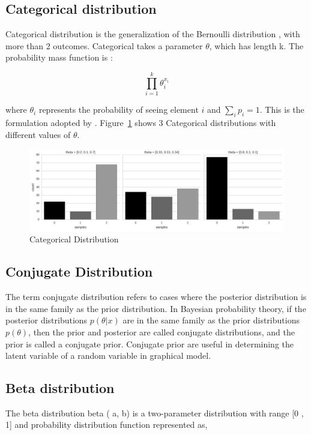 \subsection*{Categorical distribution}
Categorical distribution is the generalization of the Bernoulli distribution , with more than 2 outcomes.  Categorical takes a parameter $\theta$, which has length k. The probability mass function is :

$$
\prod_{i=1}^k \theta_i^{x_i}
$$

where $\theta_i$ represents the probability of seeing element $i$ and $\sum_{i}p_i = 1$. This is the formulation adopted by \cite{bishop2007pattern}.  Figure~\ref{fig:Categorical_sample} shows 3 Categorical distributions with different values of $\theta$.

\begin{figure}[htp]
\centering
\includegraphics[width=\textwidth]{images/Categorical.png}
\caption{Categorical Distribution}
\label{fig:Categorical_sample}
\end{figure}


\subsection*{Conjugate Distribution}
The term conjugate distribution \cite{BS:BS3830070108} refers to cases where the posterior distribution is in the same family as the prior distribution. In Bayesian probability theory, if the posterior distributions $p(\theta | x)$ are in the same family as the prior distributions $p(\theta)$, then the prior and posterior are called conjugate distributions, and the prior is called a conjugate prior.  Conjugate prior are useful in determining the latent variable of a random variable in graphical model. 


\subsection*{Beta distribution}
The beta distribution beta ( a, b) is a two-parameter distribution with range [0 , 1] and probability distribution function represented as,

